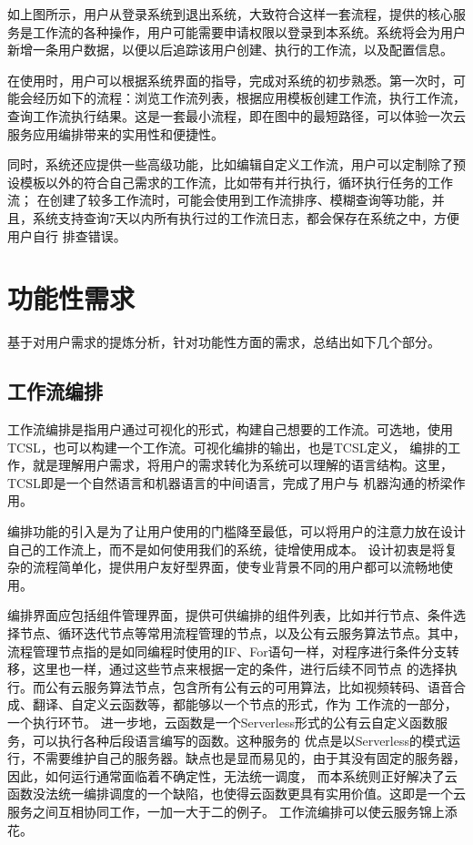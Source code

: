 如上图所示，用户从登录系统到退出系统，大致符合这样一套流程，提供的核心服务是工作流的各种操作，用户可能需要申请权限以登录到本系统。系统将会为用户
新增一条用户数据，以便以后追踪该用户创建、执行的工作流，以及配置信息。

在使用时，用户可以根据系统界面的指导，完成对系统的初步熟悉。第一次时，可能会经历如下的流程：浏览工作流列表，根据应用模板创建工作流，执行工作流，
查询工作流执行结果。这是一套最小流程，即在图中的最短路径，可以体验一次云服务应用编排带来的实用性和便捷性。

同时，系统还应提供一些高级功能，比如编辑自定义工作流，用户可以定制除了预设模板以外的符合自己需求的工作流，比如带有并行执行，循环执行任务的工作流；
在创建了较多工作流时，可能会使用到工作流排序、模糊查询等功能，并且，系统支持查询7天以内所有执行过的工作流日志，都会保存在系统之中，方便用户自行
排查错误。



\section{功能性需求}
基于对用户需求的提炼分析，针对功能性方面的需求，总结出如下几个部分。

\subsection{工作流编排}
工作流编排是指用户通过可视化的形式，构建自己想要的工作流。可选地，使用TCSL，也可以构建一个工作流。可视化编排的输出，也是TCSL定义，
编排的工作，就是理解用户需求，将用户的需求转化为系统可以理解的语言结构。这里，TCSL即是一个自然语言和机器语言的中间语言，完成了用户与
机器沟通的桥梁作用。

编排功能的引入是为了让用户使用的门槛降至最低，可以将用户的注意力放在设计自己的工作流上，而不是如何使用我们的系统，徒增使用成本。
设计初衷是将复杂的流程简单化，提供用户友好型界面，使专业背景不同的用户都可以流畅地使用。

编排界面应包括组件管理界面，提供可供编排的组件列表，比如并行节点、条件选择节点、循环迭代节点等常用流程管理的节点，以及公有云服务算法节点。其中，
流程管理节点指的是如同编程时使用的IF、For语句一样，对程序进行条件分支转移，这里也一样，通过这些节点来根据一定的条件，进行后续不同节点
的选择执行。而公有云服务算法节点，包含所有公有云的可用算法，比如视频转码、语音合成、翻译、自定义云函数等，都能够以一个节点的形式，作为
工作流的一部分，一个执行环节。 进一步地，云函数是一个Serverless形式的公有云自定义函数服务，可以执行各种后段语言编写的函数。这种服务的
优点是以Serverless的模式运行，不需要维护自己的服务器\cite{Jeffery_2021}。缺点也是显而易见的，由于其没有固定的服务器，因此，如何运行通常面临着不确定性，无法统一调度，
而本系统则正好解决了云函数没法统一编排调度的一个缺陷，也使得云函数更具有实用价值。这即是一个云服务之间互相协同工作，一加一大于二的例子。
工作流编排可以使云服务锦上添花。

